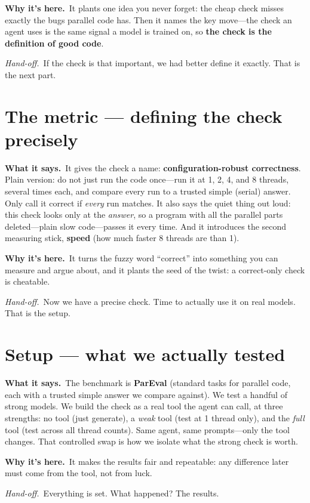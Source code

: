 \documentclass[11pt]{article}
\newcommand{\handoff}[1]{\textit{Hand-off.}\ #1}
\newcommand{\says}[1]{\textbf{What it says.}\ #1}
\newcommand{\why}[1]{\textbf{Why it's here.}\ #1}
\begin{document}
\why{It plants one idea you never forget: the cheap check misses exactly the bugs parallel
code has. Then it names the key move---the check an agent uses is the same signal a model
is trained on, so \textbf{the check is the definition of good code}.}

\handoff{If the check is that important, we had better define it exactly. That is the next
part.}

\section{The metric --- defining the check precisely}
\says{It gives the check a name: \textbf{configuration-robust correctness}. Plain version:
do not just run the code once---run it at 1, 2, 4, and 8 threads, several times each, and
compare every run to a trusted simple (serial) answer. Only call it correct if
\emph{every} run matches. It also says the quiet thing out loud: this check looks only at
the \emph{answer}, so a program with all the parallel parts deleted---plain slow
code---passes it every time. And it introduces the second measuring stick,
\textbf{speed} (how much faster 8 threads are than 1).}

\why{It turns the fuzzy word ``correct'' into something you can measure and argue about,
and it plants the seed of the twist: a correct-only check is cheatable.}

\handoff{Now we have a precise check. Time to actually use it on real models. That is the
setup.}

\section{Setup --- what we actually tested}
\says{The benchmark is \textbf{ParEval} (standard tasks for parallel code, each with a
trusted simple answer we compare against). We test a handful of strong models. We build
the check as a real tool the agent can call, at three strengths: no tool (just generate),
a \emph{weak} tool (test at 1 thread only), and the \emph{full} tool (test across all
thread counts). Same agent, same prompts---only the tool changes. That controlled swap is
how we isolate what the strong check is worth.}

\why{It makes the results fair and repeatable: any difference later must come from the
tool, not from luck.}

\handoff{Everything is set. What happened? The results.}
\end{document}
